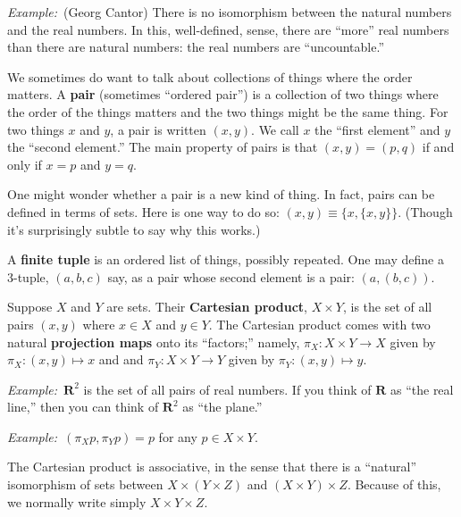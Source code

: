 \documentclass[12pt, a4paper]{article}
\newcommand{\defn}[1]{\textbf{#1}}
\newcommand{\set}[1]{\mathbold{#1}}
\newcommand{\eg}{\emph{Example:}\relax}
\begin{document}
\eg\ (Georg Cantor) There is no isomorphism between the natural
numbers and the real numbers. In this, well-defined, sense, there are
``more'' real numbers than there are natural numbers: the real numbers
are ``uncountable.''

We sometimes do want to talk about collections of things where the
order matters. A \defn{pair} (sometimes “ordered pair”) is a
collection of two things where the order of the things matters and the
two things might be the same thing. For two things $x$ and $y$, a pair
is written $(x, y)$. We call $x$ the “first element” and $y$ the
“second element.” The main property of pairs is that $(x,y)=(p,q)$ if
and only if $x=p$ and $y=q$.

One might wonder whether a pair is a new kind of thing. In fact, pairs
can be defined in terms of sets. Here is one way to do so: $(x, y)\equiv
\{x, \{x,y\}\}$. (Though it's surprisingly subtle to say why this works.)

A \defn{finite tuple} is an ordered list of things, possibly
repeated. One may define a 3-tuple, $(a, b, c)$ say, as a pair whose
second element is a pair: $(a, (b, c))$.
  
Suppose $X$ and $Y$ are sets. Their \defn{Cartesian product}, $X \times Y$,
is the set of all pairs $(x, y)$ where $x \in X$ and $y \in Y$. The
Cartesian product comes with two natural \defn{projection maps} onto
its ``factors;'' namely, $\pi_X\colon X \times Y \to X$ given by $\pi_X\colon
(x,y)\mapsto x$ and and $\pi_Y\colon X \times Y \to Y$ given by $\pi_Y\colon (x,y)\mapsto y$.

\eg\ $\set{R}^2$ is the set of all pairs of real numbers. If you think
of $\set{R}$ as ``the real line,'' then you can think of $\set{R}^2$
as ``the plane.''

\eg\ $(\pi_X p, \pi_Y p) = p$ for any $p \in X \times Y$.

The Cartesian product is associative, in the sense that there is a
``natural'' isomorphism of sets between $X \times (Y \times Z)$ and $(X \times Y) \times
Z$. Because of this, we normally write simply $X \times Y \times Z$.
\end{document}
